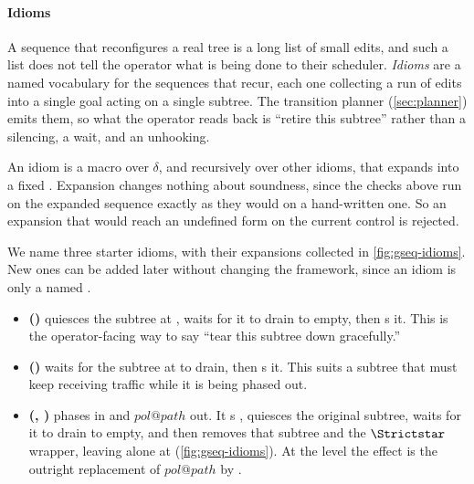\paragraph{Idioms}

A sequence that reconfigures a real tree is a long list of small edits, and such a list does not tell the operator what is being done to their scheduler.
\emph{Idioms} are a named vocabulary for the sequences that recur, each one collecting a run of edits into a single goal acting on a single subtree.
The transition planner (\cref{sec:planner}) emits them, so what the operator reads back is ``retire this subtree'' rather than a silencing, a wait, and an unhooking.

An idiom is a macro over \(\delta\), and recursively over other idioms, that expands into a fixed \gseq.
Expansion changes nothing about soundness, since the checks above run on the expanded sequence exactly as they would on a hand-written one.
So an expansion that would reach an undefined form on the current control is rejected.

We name three starter idioms, with their expansions collected in \cref{fig:gseq-idioms}.
New ones can be added later without changing the framework, since an idiom is only a named \gseq.

\begin{itemize}
\item \textbf{\Retire(\pth)} quiesces the subtree at \pth, waits for it to drain to empty, then \Remove{}s it.
This is the operator-facing way to say ``tear this subtree down gracefully.''

\item \textbf{\SlowRetire(\pth)} waits for the subtree at \pth to drain, then \Remove{}s it.
This suits a subtree that must keep receiving traffic while it is being phased out.

\item \textbf{\Replace(\pth, \survivor)} phases \survivor in and \(\mathit{pol}@\mathit{path}\) out.
It \Designate{}s \survivor, quiesces the original subtree, waits for it to drain to empty, and then removes that subtree and the \(\Strictstar\) wrapper, leaving \survivor alone at \pth (\cref{fig:gseq-idioms}).
At the \pol level the effect is the outright replacement of \(\mathit{pol}@\mathit{path}\) by \survivor.

\end{itemize}

